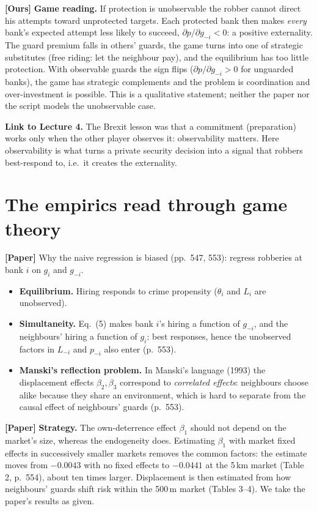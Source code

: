 \documentclass[11pt,a4paper]{article}
\newcommand{\paper}{\textbf{[Paper]}}
\newcommand{\ours}{\textbf{[Ours]}}
\begin{document}
\ours{} \textbf{Game reading.} If protection is unobservable the robber cannot direct his attempts toward unprotected targets. Each protected bank then makes \emph{every} bank's expected attempt less likely to succeed,
$\partial p/\partial g_{-i}<0$: a positive externality. The guard premium falls in others' guards, the game turns into one of strategic substitutes (free riding: let the neighbour pay), and the equilibrium has too little
protection. With observable guards the sign flips ($\partial p/\partial g_{-i}>0$ for unguarded banks), the game has strategic complements and the problem is coordination and over-investment is possible. This is a qualitative
statement; neither the paper nor the script models the unobservable case.

\textbf{Link to Lecture 4.} The Brexit lesson was that a commitment (preparation) works only when the other player observes it: observability matters. Here observability is what turns a private security decision into a
signal that robbers best-respond to, i.e.\ it creates the externality.

\section{The empirics read through game theory}

\paper{} Why the naive regression is biased (pp.\ 547, 553): regress robberies at bank $i$ on $g_i$ and $g_{-i}$.
\begin{itemize}
  \item \textbf{Equilibrium.} Hiring responds to crime propensity ($\theta_i$ and $L_i$ are unobserved).
  \item \textbf{Simultaneity.} Eq.\ (5) makes bank $i$'s hiring a function of $g_{-i}$, and the neighbours' hiring a function of $g_i$: best responses, hence the unobserved factors in $L_{-i}$ and $p_{-i}$ also enter
        (p.\ 553).
  \item \textbf{Manski's reflection problem.} In Manski's language (1993) the displacement effects $\beta_2,\beta_3$ correspond to \emph{correlated effects}: neighbours choose alike because they share an environment, which
        is hard to separate from the causal effect of neighbours' guards (p.\ 553).
\end{itemize}
\paper{} \textbf{Strategy.} The own-deterrence effect $\beta_1$ should not depend on the market's size, whereas the endogeneity does. Estimating $\beta_1$ with market fixed effects in successively smaller markets removes the
common factors: the estimate moves from $-0.0043$ with no fixed effects to $-0.0441$ at the 5\,km market (Table 2, p.\ 554), about ten times larger. Displacement is then estimated from how neighbours' guards shift risk within
the 500\,m market (Tables 3--4). We take the paper's results as given.
\end{document}
